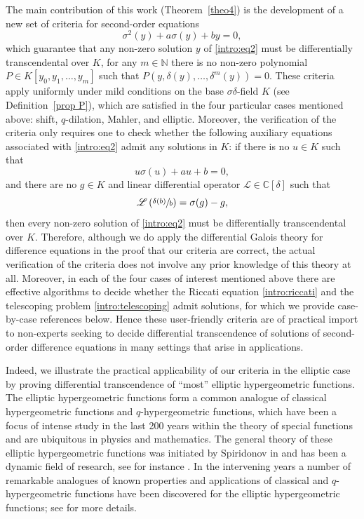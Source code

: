 \documentclass[JEP,XML,SOM,Unicode]{cedram}
\let\mathcal\mathscr
\theoremstyle{definition}
\begin{document}
The main contribution of this work (Theorem~\ref{theo4}) is the development of a new set of criteria for second-order equations
\begin{equation}\label{intro:eq2} \sigma^2(y)+a\sigma(y)+by=0,\end{equation}
which guarantee that any non-zero solution $y$ of \eqref{intro:eq2} must be differentially transcendental over $K$, \ie for any $m\in\mathbb{N}$ there is no non-zero polynomial $P\in K[y_0,y_1,\dots,y_m]$ such that $P(y,\delta(y),\dots,\delta^m(y))=0$. These criteria apply uniformly under mild conditions on the base $\sigma\delta$-field $K$ (see Definition~\ref{prop P}), which are satisfied in the four particular cases mentioned above: shift, $q$-dilation, Mahler, and elliptic. Moreover, the verification of the criteria only requires one to check whether the following auxiliary equations associated with \eqref{intro:eq2} admit any solutions in $K$: if there is no $u\in K$ such that
\begin{equation}\label{intro:riccati} u\sigma(u)+au+b=0,
\end{equation}
and there are no $g\in K$ and linear differential operator $\mathcal{L}\in\mathbb{C}[\delta]$ such that
\begin{equation}\label{intro:telescoping} \mathcal{L}\left(\sfrac{\delta(b)}{b}\right)=\sigma(g)-g,
\end{equation}
then every non-zero solution of \eqref{intro:eq2} must be differentially transcendental over $K$. Therefore, although we do apply the differential Galois theory for difference equations \cite{HS} in the proof that our criteria are correct, the actual verification of the criteria does not involve any prior knowledge of this theory at all. Moreover, in each of the four cases of interest mentioned above there are effective algorithms to decide whether the Riccati equation \eqref{intro:riccati} and the telescoping problem \eqref{intro:telescoping} admit solutions, for which we provide case-by-case references below. Hence these user-friendly criteria are of practical import to non-experts seeking to decide differential transcendence of solutions of second-order difference equations in many settings that arise in applications.\enlargethispage{.5\baselineskip}%

Indeed, we illustrate the practical applicability of our criteria in the elliptic case by proving differential transcendence of ``most'' elliptic hypergeometric functions. The elliptic hypergeometric functions form a common analogue of classical hypergeometric functions and $q$-hypergeometric functions, which have been a focus of intense study in the last 200 years within the theory of special functions and are ubiquitous in physics and mathematics. The general theory of these elliptic hypergeometric functions was initiated by Spiridonov in \cite{spiridonov2016elliptic} and has been a dynamic field of research, see for instance \cite{van2007hyperbolic,fokko2009basic,
magnus2009elliptic,rains2010transformations,
rosengren2002elliptic}. In the intervening years a number of remarkable analogues of known properties and applications of classical and $q$-hypergeometric functions have been discovered for the elliptic hypergeometric functions; see \cite{spiridonov2016elliptic} for more details.
\end{document}
